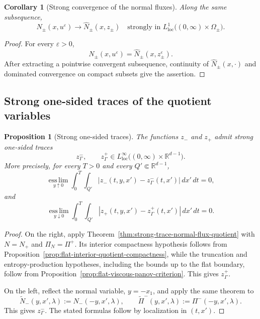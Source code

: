 \documentclass[11pt]{amsart}
\numberwithin{equation}{section}
\theoremstyle{plain}
\newtheorem{proposition}[theorem]{Proposition}
\newtheorem{corollary}[theorem]{Corollary}
\theoremstyle{definition}
\theoremstyle{remark}
\begin{document}
\begin{corollary}[Strong convergence of the normal fluxes]
\label{cor:flat-normal-flux-convergence}
Along the same subsequence,
\begin{equation}
\label{eq:flat-normal-flux-convergence}
    N_\pm(x,u^\varepsilon)
    \longrightarrow
    \widehat N_\pm(x,z_\pm)
    \quad\text{strongly in }
    L^1_{\mathrm{loc}}
    \bigl((0,\infty)\times\Omega_\pm\bigr).
\end{equation}
\end{corollary}

\begin{proof}
For every \(\varepsilon>0\),
\[
    N_\pm(x,u^\varepsilon)
    =
    \widehat N_\pm(x,z_\pm^\varepsilon).
\]
After extracting a pointwise convergent subsequence, continuity of
\(\widehat N_\pm(x,\cdot)\) and dominated convergence on compact subsets
give the assertion.
\end{proof}

\subsection{Strong one-sided traces of the quotient variables}
\label{subsec:flat-projected-traces}

\begin{proposition}[Strong one-sided traces]
\label{prop:flat-projected-traces}
The functions \(z_-\) and \(z_+\) admit strong one-sided traces
\[
    z^-_\Gamma,
    \qquad
    z^+_\Gamma
    \in
    L^\infty_{\mathrm{loc}}
    \bigl((0,\infty)\times\mathbb R^{d-1}\bigr).
\]
More precisely, for every \(T>0\) and every
\(Q'\Subset\mathbb R^{d-1}\),
\begin{equation}
\label{eq:flat-left-strong-projected-trace}
    \operatorname*{ess\,lim}_{y\uparrow0}
    \int_0^T\int_{Q'}
        |z_-(t,y,x')-z^-_\Gamma(t,x')|\,dx'\,dt
    =0,
\end{equation}
and
\begin{equation}
\label{eq:flat-right-strong-projected-trace}
    \operatorname*{ess\,lim}_{y\downarrow0}
    \int_0^T\int_{Q'}
        |z_+(t,y,x')-z^+_\Gamma(t,x')|\,dx'\,dt
    =0.
\end{equation}
\end{proposition}

\begin{proof}
On the right, apply
Theorem~\ref{thm:strong-trace-normal-flux-quotient} with
\(N=N_+\) and \(\Pi_N=\Pi^+\). Its interior compactness hypothesis follows
from Proposition~\ref{prop:flat-interior-quotient-compactness}, while the
truncation and entropy-production hypotheses, including the bounds up to the
flat boundary, follow from
Proposition~\ref{prop:flat-viscous-panov-criterion}. This gives
\(z^+_\Gamma\).

On the left, reflect the normal variable, \(y=-x_1\), and apply the same
theorem to
\[
    \widetilde N_-(y,x',\lambda)
    :=N_-(-y,x',\lambda),
    \qquad
    \widetilde\Pi^-(y,x',\lambda)
    :=\Pi^-(-y,x',\lambda).
\]
This gives \(z^-_\Gamma\). The stated formulas follow by localization in
\((t,x')\).
\end{proof}
\end{document}
